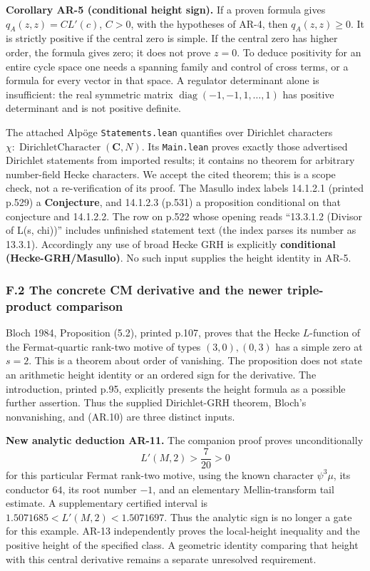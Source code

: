 \documentclass[11pt,a4paper]{article}
\begin{document}
\textbf{Corollary AR-5 (conditional height sign).} If a proven formula
gives \(q_A(z,z)=C L'(c)\), \(C>0\), with the hypotheses of AR-4, then
\(q_A(z,z)\ge0\). It is strictly positive if the central zero is simple.
If the central zero has higher order, the formula gives zero; it does
not prove \(z=0\). To deduce positivity for an entire cycle space one
needs a spanning family and control of cross terms, or a formula for
every vector in that space. A regulator determinant alone is
insufficient: the real symmetric matrix
\(\operatorname{diag}(-1,-1,1,\ldots,1)\) has positive determinant and
is not positive definite.

The attached Alpöge \texttt{Statements.lean} quantifies over Dirichlet
characters \(\chi:\operatorname{DirichletCharacter}(\mathbf C,N)\). Its
\texttt{Main.lean} proves exactly those advertised Dirichlet statements
from imported results; it contains no theorem for arbitrary number-field
Hecke characters. We accept the cited theorem; this is a scope check,
not a re-verification of its proof. The Masullo index labels 14.1.2.1
(printed p.529) a \textbf{Conjecture}, and 14.1.2.3 (p.531) a
proposition conditional on that conjecture and 14.1.2.2. The row on
p.522 whose opening reads ``13.3.1.2 (Divisor of L(s, chi))'' includes
unfinished statement text (the index parses its number as 13.3.1).
Accordingly any use of broad Hecke GRH is explicitly \textbf{conditional
(Hecke-GRH/Masullo)}. No such input supplies the height identity in
AR-5.

\subsubsection{F.2 The concrete CM derivative and the newer
triple-product
comparison}\label{f.2-the-concrete-cm-derivative-and-the-newer-triple-product-comparison}

Bloch 1984, Proposition (5.2), printed p.107, proves that the Hecke
\(L\)-function of the Fermat-quartic rank-two motive of types
\((3,0),(0,3)\) has a simple zero at \(s=2\). This is a theorem about
order of vanishing. The proposition does not state an arithmetic height
identity or an ordered sign for the derivative. The introduction,
printed p.95, explicitly presents the height formula as a possible
further assertion. Thus the supplied Dirichlet-GRH theorem, Bloch's
nonvanishing, and (AR.10) are three distinct inputs.

\textbf{New analytic deduction AR-11.} The companion proof
 proves unconditionally \[
L'(M,2)>\frac7{20}>0
\] for this particular Fermat rank-two motive, using the known character
\(\psi^3\mu\), its conductor \(64\), its root number \(-1\), and an
elementary Mellin-transform tail estimate. A supplementary certified
interval is \(1.5071685<L'(M,2)<1.5071697\). Thus the analytic sign is
no longer a gate for this example. AR-13 independently proves the
local-height inequality and the positive height of the specified class.
A geometric identity comparing that height with this central derivative
remains a separate unresolved requirement.
\end{document}
